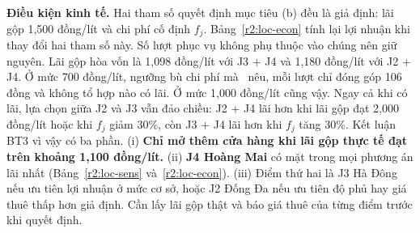 {
\textbf{Điều kiện kinh tế.} Hai tham số quyết định mục tiêu (b) đều là giả định:
lãi gộp 1,500 đồng/lít và chi phí cố định $f_j$. Bảng~\ref{r2:loc-econ} tính
lại lợi nhuận khi thay đổi hai tham số này. Số lượt phục vụ không phụ thuộc vào
chúng nên giữ nguyên. Lãi gộp hòa vốn là 1,098 đồng/lít với J3 + J4 và 1,180
đồng/lít với J2 + J4. Ở mức 700 đồng/lít, ngưỡng bù chi phí mà~\cite{chietkhau}
nêu, mỗi lượt chỉ đóng góp 106 đồng và không tổ hợp nào có lãi. Ở mức 1,000
đồng/lít cũng vậy. Ngay cả khi có lãi, lựa chọn giữa J2 và J3 vẫn đảo chiều:
J2 + J4 lãi hơn khi lãi gộp đạt 2,000 đồng/lít hoặc khi $f_j$ giảm 30\%,
còn J3 + J4 lãi hơn khi $f_j$ tăng 30\%. Kết luận BT3 vì vậy có ba phần.
(i) \textbf{Chỉ mở thêm cửa hàng khi lãi gộp thực tế đạt trên khoảng 1,100
đồng/lít.} (ii) \textbf{J4 Hoàng Mai} có mặt trong mọi phương án lãi nhất (Bảng~\ref{r2:loc-sens} và~\ref{r2:loc-econ}).
(iii) Điểm thứ hai là J3 Hà Đông nếu ưu tiên lợi nhuận ở mức cơ sở, hoặc J2
Đống Đa nếu ưu tiên độ phủ hay giá thuê thấp hơn giả định. Cần lấy lãi gộp
thật và báo giá thuê của từng điểm trước khi quyết định.

}
